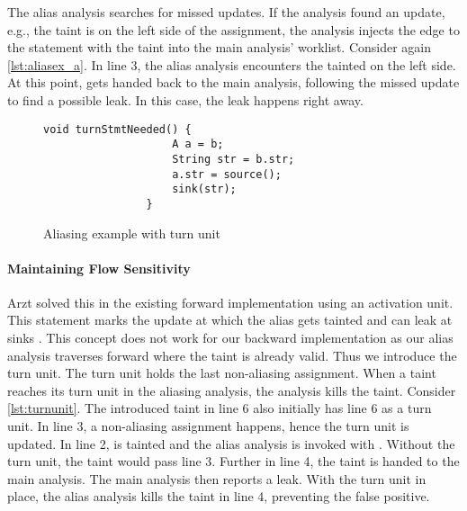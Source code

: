 \documentclass[../draft.tex]{subfiles}
\begin{document}
    The alias analysis searches for missed updates.
    If the analysis found an update, e.g., the taint is on the left side of the assignment, the analysis injects the edge to the statement with the taint into the main analysis' worklist.
    Consider again \autoref{lst:aliasex_a}.
    In line 3, the alias analysis encounters the tainted  on the left side.
    At this point,  gets handed back to the main analysis, following the missed update to find a possible leak. In this case, the leak happens right away.

    \begin{figure}[tbp]
        \centering
        \begin{adjustbox}{max width=\columnwidth}
            \begin{lstlisting}[gobble=16]
                void turnStmtNeeded() {
                    A a = b;
                    String str = b.str;
                    a.str = source();
                    sink(str);
                }
            \end{lstlisting}
        \end{adjustbox}
        \caption{Aliasing example with turn unit}
        \label{lst:turnunit}
    \end{figure}

    \paragraph{Maintaining Flow Sensitivity}
    Arzt solved this in the existing forward implementation using an activation unit.
    This statement marks the update at which the alias gets tainted and can leak at sinks \cite{Arzt2017PhD}.
    This concept does not work for our backward implementation as our alias analysis traverses forward where the taint is already valid.
    Thus we introduce the turn unit.
    The turn unit holds the last non-aliasing assignment.
    When a taint reaches its turn unit in the aliasing analysis, the analysis kills the taint.
    Consider \autoref{lst:turnunit}.
    The introduced taint  in line 6 also initially has line 6 as a turn unit.
    In line 3, a non-aliasing assignment happens, hence the turn unit is updated.
    In line 2,  is tainted and the alias analysis is invoked with .
    Without the turn unit, the taint would pass line 3.
    Further in line 4, the taint is handed to the main analysis.
    The main analysis then reports a leak.
    With the turn unit in place, the alias analysis kills the taint in line 4, preventing the false positive.
\end{document}
